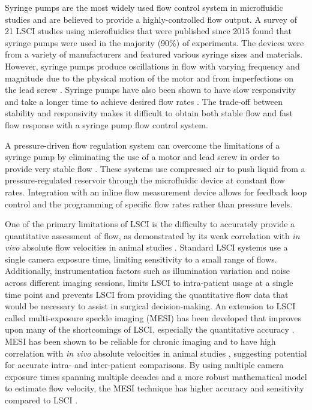 \documentclass[12pt]{spieman}
\begin{document}
\begin{spacing}{2}
Syringe pumps are the most widely used flow control system in microfluidic studies and are believed to provide a highly-controlled flow output. A survey of 21 LSCI studies using microfluidics that were published since 2015 found that syringe pumps were used in the majority (90\%) of experiments. The devices were from a variety of manufacturers and featured various syringe sizes and materials. However, syringe pumps produce oscillations in flow with varying frequency and magnitude due to the physical motion of the motor and from imperfections on the lead screw \cite{Korczyk:2010eu,Li:2014ca}. Syringe pumps have also been shown to have slow responsivity and take a longer time to achieve desired flow rates \cite{Zhou:2011ey}. The trade-off between stability and responsivity makes it difficult to obtain both stable flow and fast flow response with a syringe pump flow control system.

A pressure-driven flow regulation system can overcome the limitations of a syringe pump by eliminating the use of a motor and lead screw in order to provide very stable flow \cite{Korczyk:2010eu,Li:2014ca,Zhou:2011ey}. These systems use compressed air to push liquid from a pressure-regulated reservoir through the microfluidic device at constant flow rates. Integration with an inline flow measurement device allows for feedback loop control and the programming of specific flow rates rather than pressure levels.

One of the primary limitations of LSCI is the difficulty to accurately provide a quantitative assessment of flow, as demonstrated by its weak correlation with \textit{in vivo} absolute flow velocities in animal studies \cite{Kazmi:2013hp}. Standard LSCI systems use a single camera exposure time, limiting sensitivity to a small range of flows. Additionally, instrumentation factors such as illumination variation and noise across different imaging sessions, limits LSCI to intra-patient usage at a single time point and prevents LSCI from providing the quantitative flow data that would be necessary to assist in surgical decision-making. An extension to LSCI called multi-exposure speckle imaging (MESI) has been developed that improves upon many of the shortcomings of LSCI, especially the quantitative accuracy \cite{Parthasarathy:2008el}. MESI has been shown to be reliable for chronic imaging and to have high correlation with \textit{in vivo} absolute velocities in animal studies \cite{Kazmi:2013hp}, suggesting potential for accurate intra- and inter-patient comparisons. By using multiple camera exposure times spanning multiple decades and a more robust mathematical model to estimate flow velocity, the MESI technique has higher accuracy and sensitivity compared to LSCI \cite{Parthasarathy:2008el}.


\end{spacing}
\end{document}
